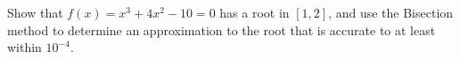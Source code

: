 %
%
%
%
%
%
%
%
%
%
%
%
%
%
%
\begin{example}
Show that $f(x) = x^3 +4x^2 -10 = 0$ has a root in $[1,2]$, and use the Bisection method to determine an approximation to the root that is accurate to at least within $10^{-4}$.
\end{example}

